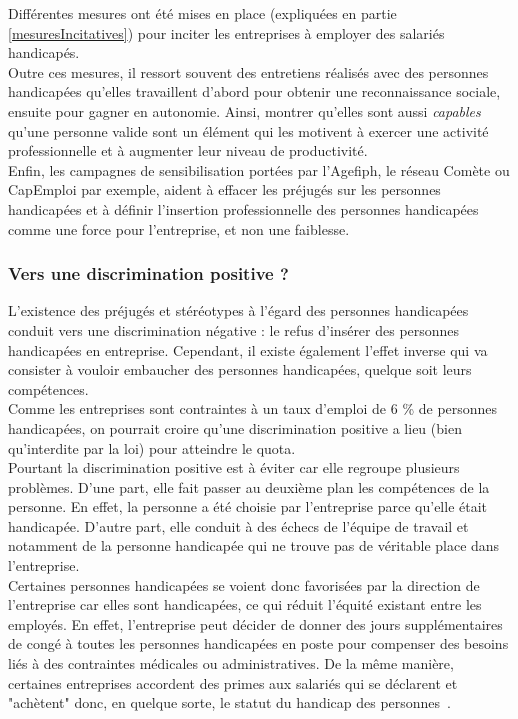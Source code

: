 Différentes mesures ont été mises en place (expliquées en partie \ref{mesuresIncitatives}) pour inciter les entreprises à employer des salariés handicapés.\\

Outre ces mesures, il ressort souvent des entretiens réalisés avec des personnes handicapées qu'elles travaillent d'abord pour obtenir une reconnaissance sociale, ensuite pour gagner en autonomie. Ainsi, montrer qu'elles sont aussi \textit{capables} qu'une personne valide sont un élément qui les motivent à exercer une activité professionnelle et à augmenter leur niveau de productivité.\\

Enfin, les campagnes de sensibilisation portées par l'Agefiph, le réseau Comète ou CapEmploi par exemple, aident à effacer les préjugés sur les personnes handicapées et à définir l'insertion professionnelle des personnes handicapées comme une force pour l'entreprise, et non une faiblesse.



\subsubsection{Vers une discrimination positive ?}
L'existence des préjugés et stéréotypes à l'égard des personnes handicapées conduit vers une discrimination négative : le refus d'insérer des personnes handicapées en entreprise. Cependant, il existe également l'effet inverse qui va consister à vouloir embaucher des personnes handicapées, quelque soit leurs compétences.\\

Comme les entreprises sont contraintes à un taux d'emploi de 6 \% de personnes handicapées, on pourrait croire qu'une discrimination positive a lieu (bien qu'interdite par la loi) pour atteindre le quota.\\

Pourtant la discrimination positive est à éviter car elle regroupe plusieurs problèmes.
D'une part, elle fait passer au deuxième plan les compétences de la personne. En effet, la personne a été choisie par l'entreprise parce qu'elle était handicapée. 
D'autre part, elle conduit à des échecs de l'équipe de travail et notamment de la personne handicapée qui ne trouve pas de véritable place dans l'entreprise.\\
Certaines personnes handicapées se voient donc favorisées par la direction de l'entreprise car elles sont handicapées, ce qui réduit l'équité existant entre les employés. En effet, l'entreprise peut décider de donner des jours supplémentaires de congé à toutes les personnes handicapées en poste pour compenser des besoins liés à des contraintes médicales ou administratives. De la même manière, certaines entreprises accordent des primes aux salariés qui se déclarent et "achètent" donc, en quelque sorte, le statut du handicap des personnes~\cite{handicapEntrepriseContraintes}.\\

